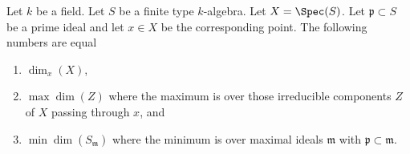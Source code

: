 \begin{lemma}
\label{lemma-dimension-at-a-point-finite-type-over-field}
Let $k$ be a field.
Let $S$ be a finite type $k$-algebra.
Let $X = \Spec(S)$.
Let $\mathfrak p \subset S$ be a prime ideal and let
$x \in X$ be the corresponding point.
The following numbers are equal
\begin{enumerate}
\item $\dim_x(X)$,
\item $\max \dim(Z)$ where the maximum is over those
irreducible components $Z$ of $X$ passing through $x$, and
\item $\min \dim(S_{\mathfrak m})$ where the minimum
is over maximal ideals $\mathfrak m$ with
$\mathfrak p \subset \mathfrak m$.
\end{enumerate}
\end{lemma}

